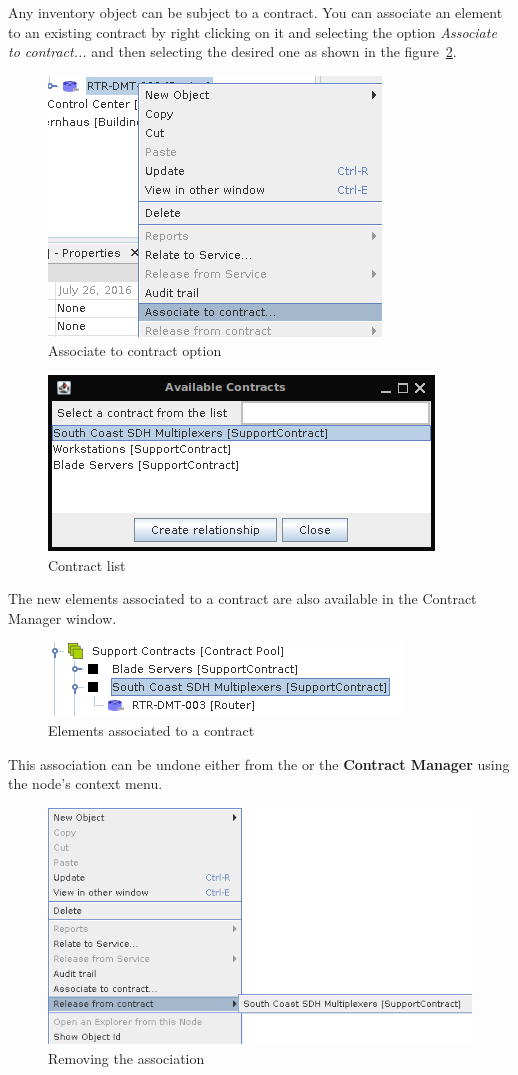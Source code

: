 \documentclass[a4paper]{article}
\begin{document}
		Any inventory object can be subject to a contract. You can associate an element to an existing contract by right clicking on it and selecting the option \textit{Associate to contract...} and then selecting the desired one as shown in the figure~\ref{fig:contract_manager_contract_list}.
		\begin{figure}[h!]
			\centering
			\includegraphics[width=0.4\linewidth]{img/contract_manager_associate_option.png}
			\caption{Associate to contract option}
			\label{fig:contract_manager_associate_option}
		\end{figure}		
		\newline
		\begin{figure}[h!]
			\centering
			\includegraphics[width=0.4\linewidth]{img/contract_manager_contract_list.png}
			\caption{Contract list}
			\label{fig:contract_manager_contract_list}
		\end{figure}
		
		The new elements associated to a contract are also available in the Contract Manager window.
		\begin{figure}[h!]
			\centering
			\includegraphics[width=0.4\linewidth]{img/contract_manager_elements.png}
			\caption{Elements associated to a contract}
			\label{fig:contract_manager_elements}
		\end{figure}
		
		\newpage
		This association can be undone either from the \textbf{} or the \textbf{Contract Manager} using the node's context menu.
		\begin{figure}[h!]
			\centering
			\includegraphics[width=0.6\linewidth]{img/contract_manager_release_from_contract.png}
			\caption{Removing the association}
			\label{fig:contract_manager_release_from_contract}
		\end{figure}
		
\end{document}
